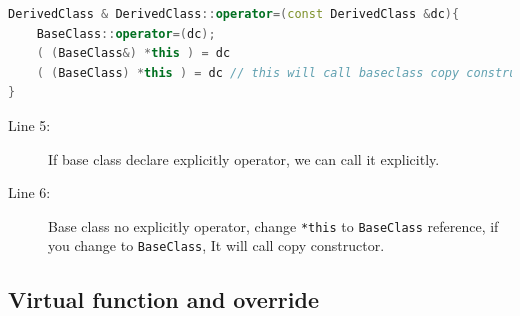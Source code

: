 \documentclass[a4paper,11pt,twoside]{book}
\begin{document}
\begin{itemize}
\begin{enumerate}
\begin{lstlisting}[frame=single, language=c++]
DerivedClass & DerivedClass::operator=(const DerivedClass &dc){
    BaseClass::operator=(dc);
    ( (BaseClass&) *this ) = dc
    ( (BaseClass) *this ) = dc // this will call baseclass copy constructor.
}
\end{lstlisting}

\begin{description}
	\item[Line 5:] If base class declare explicitly operator, we can call it explicitly.
	\item[Line 6:] Base class no explicitly operator, change \texttt{*this} to \texttt{BaseClass} reference, if you change to \texttt{BaseClass}, It will call copy constructor.
\end{description}
		
	\end{enumerate}


\end{itemize}

\subsection{Virtual function and override}
\end{document}
